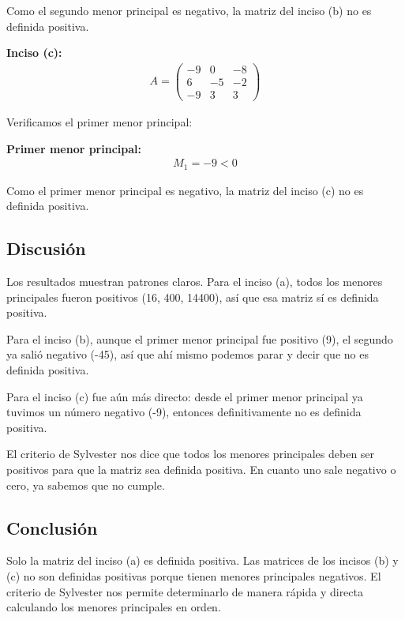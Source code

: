 \documentclass{article}
\begin{document}
Como el segundo menor principal es negativo, la matriz del inciso (b) no es definida positiva.

\textbf{Inciso (c):}
\begin{align}
     A=\begin{pmatrix} -9 & 0 & -8\\ 6 & -5 & -2\\ -9 & 3 & 3 \end{pmatrix}
\end{align}

Verificamos el primer menor principal:

\textbf{Primer menor principal:}
\begin{align}
M_1 = -9 < 0
\end{align}

Como el primer menor principal es negativo, la matriz del inciso (c) no es definida positiva.

\subsection{Discusión}

Los resultados muestran patrones claros. Para el inciso (a), todos los menores principales fueron positivos (16, 400, 14400), así que esa matriz sí es definida positiva.

Para el inciso (b), aunque el primer menor principal fue positivo (9), el segundo ya salió negativo (-45), así que ahí mismo podemos parar y decir que no es definida positiva.

Para el inciso (c) fue aún más directo: desde el primer menor principal ya tuvimos un número negativo (-9), entonces definitivamente no es definida positiva.

El criterio de Sylvester nos dice que todos los menores principales deben ser positivos para que la matriz sea definida positiva. En cuanto uno sale negativo o cero, ya sabemos que no cumple.

\subsection{Conclusión}

Solo la matriz del inciso (a) es definida positiva. Las matrices de los incisos (b) y (c) no son definidas positivas porque tienen menores principales negativos. El criterio de Sylvester nos permite determinarlo de manera rápida y directa calculando los menores principales en orden.

\end{document}

